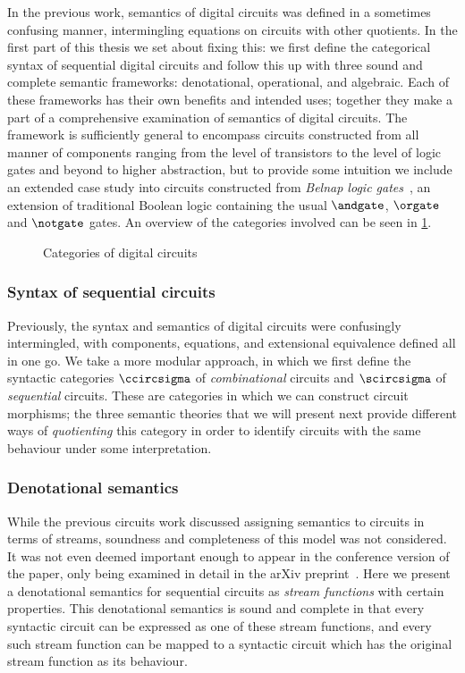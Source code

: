 In the previous work, semantics of digital circuits was defined in a sometimes
confusing manner, intermingling equations on circuits with other quotients.
In the first part of this thesis we set about fixing this: we first define the
categorical syntax of sequential digital circuits and follow this up with three
sound and complete semantic frameworks: denotational, operational, and
algebraic.
Each of these frameworks has their own benefits and intended uses; together they
make a part of a comprehensive examination of semantics of digital circuits.
The framework is sufficiently general to encompass circuits constructed from
all manner of components ranging from the level of transistors to the level of
logic gates and beyond to higher abstraction, but to provide some intuition we
include an extended case study into circuits constructed from
\emph{Belnap logic gates}~\cite{belnap1977useful}, an extension of traditional
Boolean logic containing the usual \(\andgate\), \(\orgate\) and \(\notgate\)
gates.
An overview of the categories involved can be seen in \cref{fig:circuits-map}.

\begin{figure}
    \centering
    
    \caption{Categories of digital circuits}
    \label{fig:circuits-map}
\end{figure}

\subsubsection{Syntax of sequential circuits}

Previously, the syntax and semantics of digital circuits were confusingly
intermingled, with components, equations, and extensional equivalence defined
all in one go.
We take a more modular approach, in which we first define the syntactic
categories \(\ccircsigma\) of \emph{combinational} circuits and \(\scircsigma\)
of \emph{sequential} circuits.
These are categories in which we can construct circuit morphisms; the three
semantic theories that we will present next provide different ways of
\emph{quotienting} this category in order to identify circuits with the same
behaviour under some interpretation.

\subsubsection{Denotational semantics}

While the previous circuits work discussed assigning semantics to circuits in
terms of streams, soundness and completeness of this model was not considered.
It was not even deemed important enough to appear in the conference version of
the paper, only being examined in detail in the arXiv
preprint~\cite{ghica2017diagrammatica}.
Here we present a denotational semantics for sequential circuits as
\emph{stream functions} with certain properties.
This denotational semantics is sound and complete in that every syntactic
circuit can be expressed as one of these stream functions, and every such stream
function can be mapped to a syntactic circuit which has the original stream
function as its behaviour.

